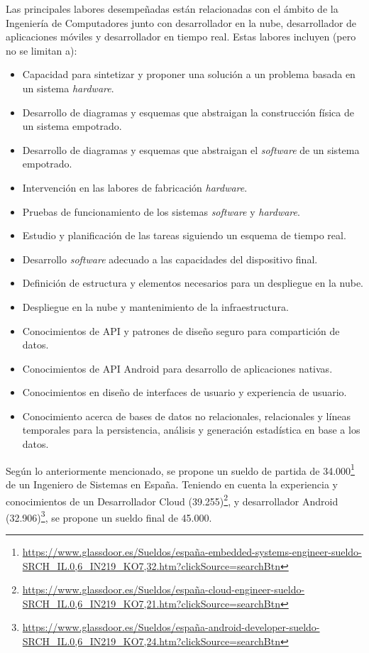 Las principales labores desempeñadas están relacionadas con el ámbito de la Ingeniería
de Computadores junto con desarrollador en la nube, desarrollador de aplicaciones
móviles y desarrollador en tiempo real. Estas labores incluyen (pero no se limitan a):

\begin{itemize}
  \item Capacidad para sintetizar y proponer una solución a un problema basada en un sistema \textit{hardware}.
  \item Desarrollo de diagramas y esquemas que abstraigan la construcción física de un sistema empotrado.
  \item Desarrollo de diagramas y esquemas que abstraigan el \textit{software} de un sistema empotrado.
  \item Intervención en las labores de fabricación \textit{hardware}.
  \item Pruebas de funcionamiento de los sistemas \textit{software} y \textit{hardware}.
  \item Estudio y planificación de las tareas siguiendo un esquema de tiempo real.
  \item Desarrollo \textit{software} adecuado a las capacidades del dispositivo final.
  \item Definición de estructura y elementos necesarios para un despliegue en la nube.
  \item Despliegue en la nube y mantenimiento de la infraestructura.
  \item Conocimientos de \ac{API} y patrones de diseño seguro para compartición de datos.
  \item Conocimientos de \ac{API} Android para desarrollo de aplicaciones nativas.
  \item Conocimientos en diseño de interfaces de usuario y experiencia de usuario.
  \item Conocimiento acerca de bases de datos no relacionales, relacionales y líneas
        temporales para la persistencia, análisis y generación estadística en base
        a los datos.
\end{itemize}

Según lo anteriormente mencionado, se propone un sueldo de partida de
34.000\footnote{\url{https://www.glassdoor.es/Sueldos/españa-embedded-systems-engineer-sueldo-SRCH_IL.0,6_IN219_KO7,32.htm?clickSource=searchBtn}}
de un Ingeniero de Sistemas en España. Teniendo en cuenta la experiencia y conocimientos
de un Desarrollador Cloud
(39.255)\footnote{\url{https://www.glassdoor.es/Sueldos/españa-cloud-engineer-sueldo-SRCH_IL.0,6_IN219_KO7,21.htm?clickSource=searchBtn}},
y desarrollador Android (32.906)\footnote{\url{https://www.glassdoor.es/Sueldos/españa-android-developer-sueldo-SRCH_IL.0,6_IN219_KO7,24.htm?clickSource=searchBtn}},
se propone un sueldo final de 45.000.
